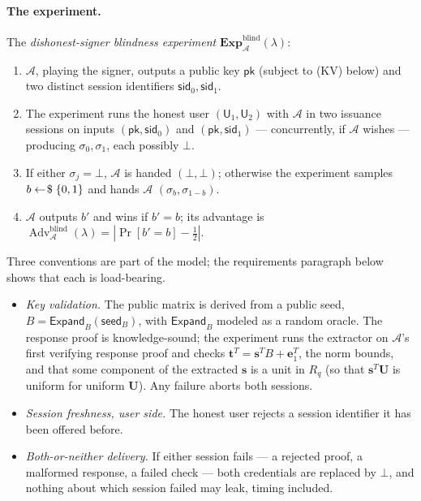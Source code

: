 \documentclass[11pt]{article}
\newcommand{\R}{R_q}
\newcommand{\sample}{\mathrel{\leftarrow\joinrel\$}}
\newcommand{\Adv}{\operatorname{Adv}}
\newcommand{\Exp}{\mathbf{Exp}}
\newcommand{\U}{\mathsf{U}}
\begin{document}
\paragraph{The experiment.}
The \emph{dishonest-signer blindness experiment}
$\Exp^{\mathrm{blind}}_{\mathcal A}(\lambda)$:
\begin{enumerate}
 \item $\mathcal A$, playing the signer, outputs a public key $\mathsf{pk}$
(subject to (KV) below) and two distinct session identifiers
$\mathsf{sid}_0,\mathsf{sid}_1$.
 \item The experiment runs the honest user $(\U_1,\U_2)$ with $\mathcal A$
in two issuance sessions on inputs $(\mathsf{pk},\mathsf{sid}_0)$ and
$(\mathsf{pk},\mathsf{sid}_1)$ --- concurrently, if $\mathcal A$ wishes ---
producing $\sigma_0,\sigma_1$, each possibly $\bot$.
 \item If either $\sigma_j=\bot$, $\mathcal A$ is handed $(\bot,\bot)$;
otherwise the experiment samples $b\sample\{0,1\}$ and hands $\mathcal A$
$(\sigma_b,\sigma_{1-b})$.
 \item $\mathcal A$ outputs $b'$ and wins if $b'=b$; its advantage is
$\Adv^{\mathrm{blind}}_{\mathcal A}(\lambda)=|\Pr[b'=b]-\tfrac12|$.
\end{enumerate}
Three conventions are part of the model; the requirements paragraph below
shows that each is load-bearing.
\begin{itemize}
 \item[(KV)] \emph{Key validation.}  The public matrix is derived from a
public seed, $B=\mathsf{Expand}_B(\mathsf{seed}_B)$, with
$\mathsf{Expand}_B$ modeled as a random oracle.  The response proof is
knowledge-sound; the experiment runs the extractor on $\mathcal A$'s first
verifying response proof and checks $\mathbf t^{T}=\mathbf s^{T}B+\mathbf
e_1^{T}$, the norm bounds, and that some component of the extracted
$\mathbf s$ is a unit in $\R$ (so that $\mathbf s^{T}\mathbf U$ is uniform
for uniform $\mathbf U$).  Any failure aborts both sessions.
 \item[(SID)] \emph{Session freshness, user side.}  The honest user rejects
a session identifier it has been offered before.
 \item[(ABORT)] \emph{Both-or-neither delivery.}  If either session fails
--- a rejected proof, a malformed response, a failed check --- both
credentials are replaced by $\bot$, and nothing about which session failed
may leak, timing included.
\end{itemize}
\end{document}
